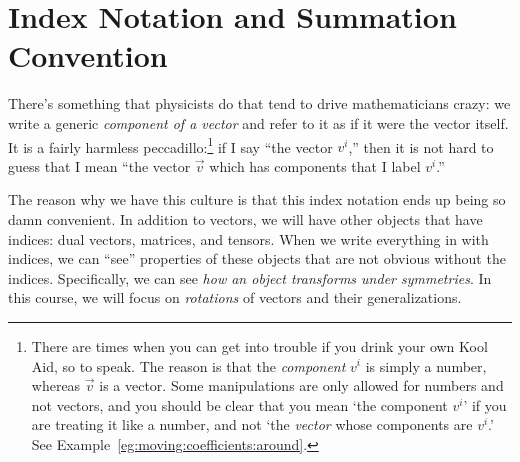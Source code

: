 \documentclass[12pt]{article}
\begin{document}
\section{Index Notation and Summation Convention}

There's something that physicists do that tend to drive mathematicians crazy: we write a generic \emph{component of a vector} and refer to it as if it were the vector itself. It is a fairly harmless peccadillo:\footnote{There are times when you can get into trouble if you drink your own Kool Aid, so to speak. The reason is that the \emph{component} $v^i$ is simply a number, whereas $\vec{v}$ is a vector. Some manipulations are only allowed for numbers and not vectors, and you should be clear that you mean `the component $v^i$' if you are treating it like a number, and not `the \emph{vector} whose components are $v^i$.' See Example~\ref{eg:moving:coefficients:around}.} if I say ``the vector $v^i$,'' then it is not hard to guess that I mean ``the vector $\vec{v}$ which has components that I label $v^i$.''

The reason why we have this culture is that this index notation ends up being so damn convenient. In addition to vectors, we will have other objects that have indices: dual vectors, matrices, and tensors. When we write everything in with indices, we can ``see'' properties of these objects that are not obvious without the indices. Specifically, we can see \emph{how an object transforms under symmetries}. In this course, we will focus on \emph{rotations} of vectors and their generalizations.  
\end{document}
